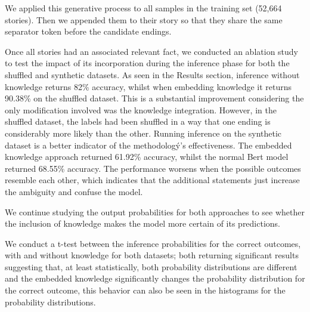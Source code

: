 \documentclass{article}
\begin{document}
\begin{multicols}{2}
We applied this generative process to all samples in the training set (52,664 stories). Then we appended them to their story so that they share the same separator token before the candidate endings.

Once all stories had an associated relevant fact, we conducted an ablation study to test the impact of its incorporation during the inference phase for both the shuffled and synthetic datasets. As seen in the Results section, inference without knowledge returns 82\% accuracy, whilst when embedding knowledge it returns 90.38\% on the shuffled dataset. This is a substantial improvement considering the only modification involved was the knowledge integration. However, in the shuffled dataset, the labels had been shuffled in a way that one ending is considerably more likely than the other. Running inference on the synthetic dataset is a better indicator of the methodologý’s effectiveness. The embedded knowledge approach returned 61.92\% accuracy, whilst the normal Bert model returned 68.55\% accuracy. The performance worsens when the possible outcomes resemble each other, which indicates that the additional statements just increase the ambiguity and confuse the model. 

We continue studying the output probabilities for both approaches to see whether the inclusion of knowledge makes the model more certain of its predictions. 

\begin{figure}[H]
    \centering
\end{figure}

We conduct a t-test between the inference probabilities for the correct outcomes, with and without knowledge for both datasets; both returning significant results suggesting that, at least statistically, both probability distributions are different and the embedded knowledge significantly changes the probability distribution for the correct outcome, this behavior can also be seen in the histograms for the probability distributions.

\begin{figure}[H]
    \centering
\end{figure}


\end{multicols}
\end{document}

